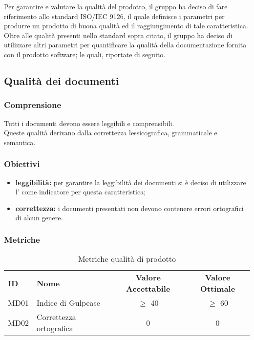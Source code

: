 Per garantire e valutare la qualità del prodotto, il gruppo ha deciso di fare riferimento allo standard ISO/IEC 9126, il quale definisce i parametri per produrre un prodotto di buona qualità ed il raggiungimento di tale caratteristica. \\
Oltre alle qualità presenti nello standard sopra citato, il gruppo ha deciso di utilizzare altri parametri per quantificare la qualità della documentazione fornita con il prodotto software; le quali, riportate di seguito.

\subsection{Qualità dei documenti}

\subsubsection{Comprensione}
Tutti i documenti devono essere leggibili e comprensibili.\\
Queste qualità derivano dalla correttezza lessicografica, grammaticale e semantica.

\subsubsection{Obiettivi}
\begin{itemize}
    \item \textbf{leggibilità:} per garantire la leggibilità dei documenti si è deciso di utilizzare l' come indicatore per questa caratteristica;
    \item \textbf{correttezza:} i documenti presentati non devono contenere errori ortografici di alcun genere.
\end{itemize}

\subsubsection{Metriche}

\begin{table} [h!]
	\begin{center}
		\begin{tabular} {m{2 cm} m{7 cm} c c }
			\rowcolor{lightgray}
			\textbf{ID} & \textbf{Nome}& \textbf{Valore Accettabile} & \textbf{Valore Ottimale}\\
			MD01 & Indice di Gulpease  		 & $\geq$ 40   			& $\geq$ 60 \\
			MD02 & Correttezza ortografica 				&0						&0
		\end{tabular}
	\caption{Metriche qualità di prodotto}
	\end{center}
\end{table}